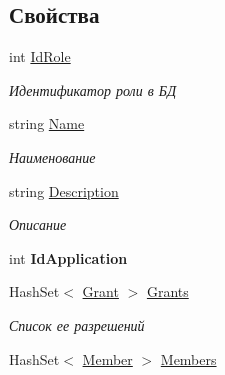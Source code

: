 \subsection*{Свойства}
\begin{DoxyCompactItemize}
\item 
int \hyperlink{class_security_1_1_model_1_1_role_a22a9268824aa9c1c18ca7db190c9a104}{Id\+Role}
\begin{DoxyCompactList}\small\item\em Идентификатор роли в БД \end{DoxyCompactList}\item 
string \hyperlink{class_security_1_1_model_1_1_role_a661e0b10075130d934665b6857bb7dfa}{Name}
\begin{DoxyCompactList}\small\item\em Наименование \end{DoxyCompactList}\item 
string \hyperlink{class_security_1_1_model_1_1_role_a8543ffa11051292477a3e6dcaf48acc0}{Description}
\begin{DoxyCompactList}\small\item\em Описание \end{DoxyCompactList}\item 
\mbox{\label{class_security_1_1_model_1_1_role_ac8d3a58468b2b9af5564b890ff4e3130}} 
int {\bfseries Id\+Application}
\item 
Hash\+Set$<$ \hyperlink{class_security_1_1_model_1_1_grant}{Grant} $>$ \hyperlink{class_security_1_1_model_1_1_role_a9ba899f91fae2cf5ddbb6693159cec01}{Grants}
\begin{DoxyCompactList}\small\item\em Список ее разрешений \end{DoxyCompactList}\item 
Hash\+Set$<$ \hyperlink{class_security_1_1_model_1_1_member}{Member} $>$ \hyperlink{class_security_1_1_model_1_1_role_aa2d5b856f8420b8925cbc37ed32218b8}{Members}

\end{DoxyCompactItemize}
